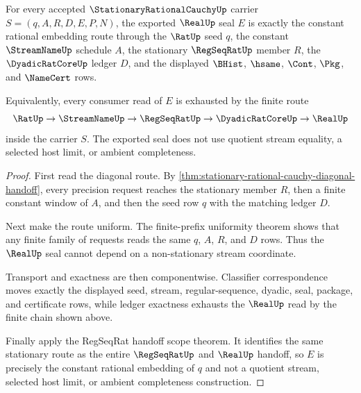 \begin{theorem}
\label{thm:stationary-rational-cauchy-real-embedding-exactness}
For every accepted $\StationaryRationalCauchyUp$ carrier $S=(q,A,R,D,E,P,N)$, the exported $\RealUp$ seal $E$ is exactly the constant rational embedding route through the $\RatUp$ seed $q$, the constant $\StreamNameUp$ schedule $A$, the stationary $\RegSeqRatUp$ member $R$, the $\DyadicRatCoreUp$ ledger $D$, and the displayed $\BHist$, $\hsame$, $\Cont$, $\Pkg$, and $\NameCert$ rows.

Equivalently, every consumer read of $E$ is exhausted by the finite route
$$
\RatUp \to \StreamNameUp \to \RegSeqRatUp \to \DyadicRatCoreUp \to \RealUp
$$
inside the carrier $S$. The exported seal does not use quotient stream equality, a selected host limit, or ambient completeness.
\end{theorem}
\begin{proof}
First read the diagonal route. By \autoref{thm:stationary-rational-cauchy-diagonal-handoff}, every precision request reaches the stationary member $R$, then a finite constant window of $A$, and then the seed row $q$ with the matching ledger $D$.

Next make the route uniform. The finite-prefix uniformity theorem shows that any finite family of requests reads the same $q$, $A$, $R$, and $D$ rows. Thus the $\RealUp$ seal cannot depend on a non-stationary stream coordinate.

Transport and exactness are then componentwise. Classifier correspondence moves exactly the displayed seed, stream, regular-sequence, dyadic, seal, package, and certificate rows, while ledger exactness exhausts the $\RealUp$ read by the finite chain shown above.

Finally apply the RegSeqRat handoff scope theorem. It identifies the same stationary route as the entire $\RegSeqRatUp$ and $\RealUp$ handoff, so $E$ is precisely the constant rational embedding of $q$ and not a quotient stream, selected host limit, or ambient completeness construction.
\end{proof}

